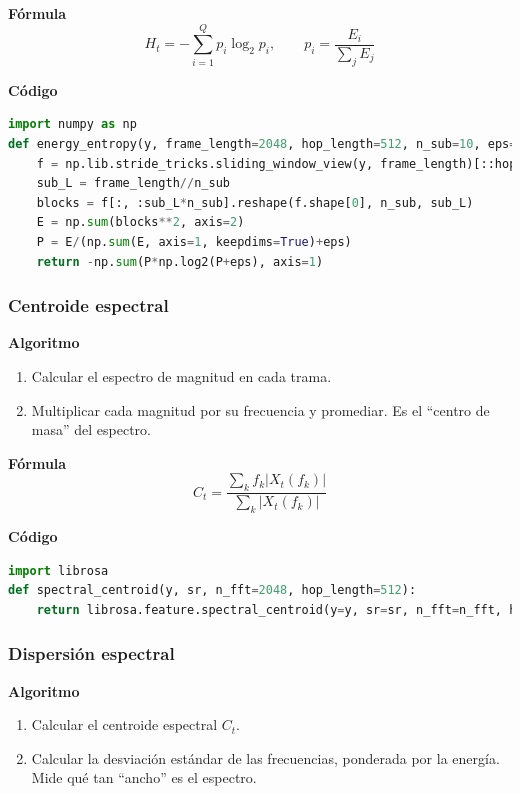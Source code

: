 \textbf{Fórmula}
\[
H_t=-\sum_{i=1}^{Q}p_i\log_2 p_i,\qquad p_i=\frac{E_i}{\sum_j E_j}
\]

\textbf{Código}
\begin{lstlisting}[language=Python, label={lst:entropy_energy_code}, caption={Entropía de energía}]
import numpy as np
def energy_entropy(y, frame_length=2048, hop_length=512, n_sub=10, eps=1e-10):
    f = np.lib.stride_tricks.sliding_window_view(y, frame_length)[::hop_length]
    sub_L = frame_length//n_sub
    blocks = f[:, :sub_L*n_sub].reshape(f.shape[0], n_sub, sub_L)
    E = np.sum(blocks**2, axis=2)
    P = E/(np.sum(E, axis=1, keepdims=True)+eps)
    return -np.sum(P*np.log2(P+eps), axis=1)
\end{lstlisting}

\subsubsection{Centroide espectral}
\textbf{Algoritmo} \parencite{tzanetakis2002musical, muller2015fmp}
\begin{enumerate}
    \item Calcular el espectro de magnitud en cada trama.
    \item Multiplicar cada magnitud por su frecuencia y promediar. Es el “centro de masa” del espectro.
\end{enumerate}

\textbf{Fórmula}
\[
C_t=\frac{\sum_{k} f_k |X_t(f_k)|}{\sum_{k}|X_t(f_k)|}
\]

\textbf{Código}
\begin{lstlisting}[language=Python, label={lst:centroid_code}, caption={Centroide espectral}]
import librosa
def spectral_centroid(y, sr, n_fft=2048, hop_length=512):
    return librosa.feature.spectral_centroid(y=y, sr=sr, n_fft=n_fft, hop_length=hop_length)[0]
\end{lstlisting}

\subsubsection{Dispersión espectral}
\textbf{Algoritmo} \parencite{tzanetakis2002musical, peeters2004large}
\begin{enumerate}
    \item Calcular el centroide espectral \(C_t\).
    \item Calcular la desviación estándar de las frecuencias, ponderada por la energía. Mide qué tan “ancho” es el espectro.
\end{enumerate}

